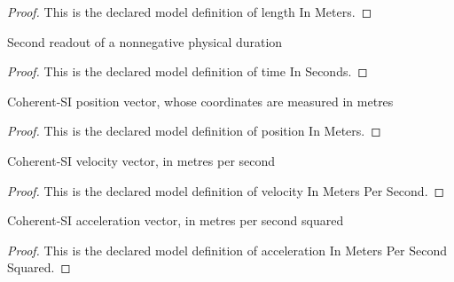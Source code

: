 \begin{proof}
  This is the declared model definition of length In Meters.
\end{proof}
\begin{definition}
  \label{def:physics:phyx-mini-0686:phyxminiproblems-problemphyxmini0686-timeinseconds}
  Second readout of a nonnegative physical duration
\end{definition}
\begin{proof}
  This is the declared model definition of time In Seconds.
\end{proof}
\begin{definition}
  \label{def:physics:phyx-mini-0686:phyxminiproblems-problemphyxmini0686-positioninmeters}
  Coherent-SI position vector, whose coordinates are measured in metres
\end{definition}
\begin{proof}
  This is the declared model definition of position In Meters.
\end{proof}
\begin{definition}
  \label{def:physics:phyx-mini-0686:phyxminiproblems-problemphyxmini0686-velocityinmeterspersecond}
  Coherent-SI velocity vector, in metres per second
\end{definition}
\begin{proof}
  This is the declared model definition of velocity In Meters Per Second.
\end{proof}
\begin{definition}
  \label{def:physics:phyx-mini-0686:phyxminiproblems-problemphyxmini0686-accelerationinmeterspersecondsquared}
  Coherent-SI acceleration vector, in metres per second squared
\end{definition}
\begin{proof}
  This is the declared model definition of acceleration In Meters Per Second Squared.
\end{proof}
